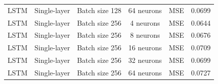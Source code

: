 \begin{landscape}
\begin{longtable}{llcccc}
LSTM & Single-layer & Batch size 128 & 64 neurons & MSE  & 0.0699 \\
LSTM & Single-layer & Batch size 256 & 4 neurons  & MSE  & 0.0644 \\
LSTM & Single-layer & Batch size 256 & 8 neurons  & MSE  & 0.0676 \\
LSTM & Single-layer & Batch size 256 & 16 neurons & MSE  & 0.0709 \\
LSTM & Single-layer & Batch size 256 & 32 neurons & MSE  & 0.0699 \\
LSTM & Single-layer & Batch size 256 & 64 neurons & MSE  & 0.0727 \\



\end{longtable}
\end{landscape}
